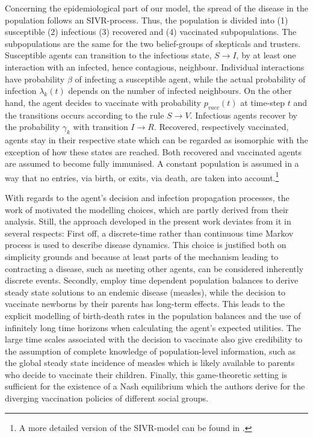 \documentclass[11pt]{article}
\begin{document}
Concerning the epidemiological part of our model, the spread of the disease in the population follows an SIVR-process. Thus, the population is divided into (1) susceptible (2) infectious (3) recovered and (4) vaccinated subpopulations. The subpopulations are the same for the two belief-groups of skepticals and trusters. Susceptible agents can transition to the infectious state, \(S \rightarrow{} I \), by at least one interaction with an infected, hence contagious, neighbour. Individual interactions have probability \(\beta\) of infecting a susceptible agent, while the actual probability of infection \(\lambda_{k}(t)\) depends on the number of infected neighbours. On the other hand, the agent decides to vaccinate with probability \(p_{vacc}(t)\) at time-step \(t\) and the transitions occurs according to the rule \(S \rightarrow{} V \). Infectious agents recover by the probability \(\gamma_{k}\) with transition \(I \rightarrow{} R\). Recovered, respectively vaccinated, agents stay in their respective state which can be regarded as isomorphic with the exception of how these states are reached. Both recovered and vaccinated agents are assumed to become fully immunised. A constant population is assumed in a way that no entries, via birth, or exits, via death, are taken into account.\footnote{A more detailed version of the SIVR-model can be found in \cite{tornatore2014}.}

With regards to the agent's decision and infection propagation processes, the work of \cite{shim2012} motivated the modelling choices, which are partly derived from their analysis. Still, the approach developed in the present work deviates from it in several respects:
First off, a discrete-time rather than continuous time Markov process is used to describe disease dynamics. This choice is justified both on simplicity grounds and because at least parts of the mechanism leading to contracting a disease, such as meeting other agents, can be considered inherently discrete events. Secondly, \cite{shim2012} employ time dependent population balances to derive steady state solutions to an endemic disease (measles), while the decision to vaccinate newborns by their parents has long-term effects. This leads to the explicit modelling of birth-death rates in the population balances and the use of infinitely long time horizons when calculating the agent's expected utilities. The large time scales associated with the decision to vaccinate also give credibility to the assumption of complete knowledge of population-level information, such as the global steady state incidence of measles which is likely available to parents who decide to vaccinate their children. Finally, this game-theoretic setting is sufficient for the existence of a Nash equilibrium which the authors derive for the diverging vaccination policies of different social groups.
\end{document}
